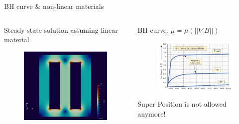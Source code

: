 \documentclass[aspectratio=43]{beamer}
\begin{document}
\begin{frame}[fragile]{BH curve \& non-linear materials}
  \begin{columns}[onlytextwidth]
    \begin{column}{.5\textwidth}
    Steady state solution assuming linear material
        \begin{figure}
            \centering
            \includegraphics[width=1\textwidth]   {figures/steady_state_cropped.png}
            \label{fig:my_label}
        \end{figure}
    \end{column}
    \begin{column}{.5\textwidth}
    \quad BH curve. $\mu = \mu(||\nabla B||)$ 
        \begin{figure}
            \centering
            \includegraphics[width=1\textwidth]{figures/BH curve.png}
            \label{fig:my_label}
        \end{figure}
    Super Position is not allowed anymore!
    \end{column}
  \end{columns}
\end{frame}
\end{document}

